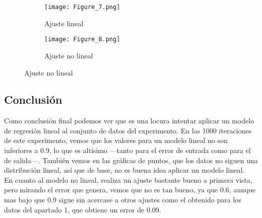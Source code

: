\begin{figure}[h]
   \centering
   \begin{subfigure}[b]{0.45\textwidth}
      \texttt{[image: Figure\_7.png]}
      \caption{Ajuste lineal}
   \end{subfigure}
   \hfill
   \begin{subfigure}[b]{0.45\textwidth}
      \texttt{[image: Figure\_8.png]}
      \caption{Ajuste no lineal}
   \end{subfigure}
\end{figure}
\subsection{Conclusión}
Como conclusión final podemos ver que es una locura intentar aplicar un modelo de regresión lineal al conjunto de datos del experimento. En las 1000 iteraciones de este experimento, vemos que los valores para un modelo lineal no son inferiores a 0.9, lo que es altísimo ---tanto para el error de entrada como para el de salida---. También vemos en las gráficas de puntos, que los datos no siguen una distribución lineal, así que de base, no es buena idea aplicar un modelo lineal.\\
En cuanto al modelo no lineal, realiza un ajuste bastante bueno a primera vista, pero mirando el error que genera, vemos que no es tan bueno, ya que 0.6, aunque mas bajo que 0.9 sigue sin acercase a otros ajustes como el obtenido para los datos del apartado 1, que obtiene un error de 0.09.
